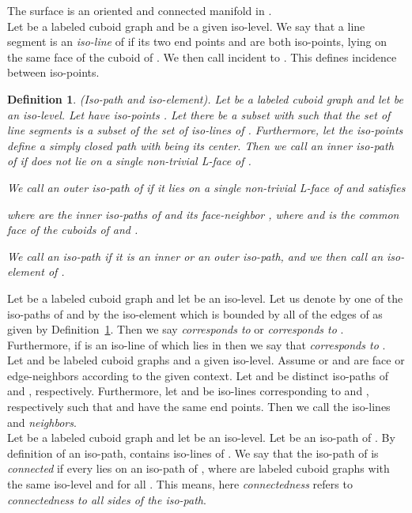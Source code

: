 \documentclass[a4paper,11pt]{article}
\newtheorem{definition}[theorem]{Definition}
\begin{document}
The surface  is an oriented and connected manifold in .\\

Let  be a labeled cuboid graph and  be a
given iso-level. We say that a line segment  is an {\it iso-line} of  if its two end points
 and  are both iso-points, lying on the same face of the cuboid of . We then call 
incident to . This defines incidence between iso-points.

\begin{definition}(Iso-path and iso-element). Let  be a labeled
cuboid graph and let  be an iso-level. Let  have  iso-points
. Let there be a subset  with 
such that the set of line segments 
is a subset of the set of iso-lines of . Furthermore, let the iso-points 
define a simply closed path  with  being its center. Then we call 
an inner iso-path of  if  does not lie on a single non-trivial L-face of .

We call  an outer iso-path of  if it lies on a single non-trivial L-face
 of  and satisfies

where  are the inner iso-paths of  and its face-neighbor ,
where  and  is the common face of the cuboids of  and .

We call  an iso-path if it is an inner or an outer iso-path, and we then call
 an iso-element of .
\label{def:labeled-graph-6}
\end{definition}

Let  be a labeled
cuboid graph and let  be an iso-level. Let us denote by  one of the iso-paths
of  and by  the iso-element which is bounded by all of the edges of 
as given by Definition~\ref{def:labeled-graph-6}. Then we say  {\it corresponds to}  or 
{\it corresponds to} . Furthermore, if  is an iso-line of  which lies in  then we say
that  {\it corresponds to} .\\

Let  and 
be labeled cuboid graphs and  a given iso-level. Assume  or  and  are
face or edge-neighbors according to the given context. Let  and  be distinct
iso-paths of  and , respectively. Furthermore, let  and  be iso-lines
corresponding to  and , respectively such that  and  have the same end points.
Then we call the iso-lines  and  {\it neighbors}.\\

Let  be a labeled cuboid graph and
let  be an iso-level. Let  be an iso-path of . By definition of an iso-path,
 contains  iso-lines  of . We say that the iso-path 
of  is {\it connected} if every  lies on an iso-path  of , where 
are labeled cuboid graphs with the same iso-level  and  for all .
This means, here {\it connectedness} refers to {\it connectedness to all sides of the iso-path}.\\
\end{document}
